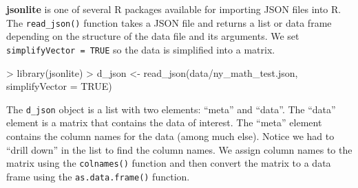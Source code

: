 \documentclass[
]{book}
\newenvironment{Shaded}{\begin{snugshade}}{\end{snugshade}}
\newcommand{\AttributeTok}[1]{\textcolor[rgb]{0.77,0.63,0.00}{#1}}
\newcommand{\ConstantTok}[1]{\textcolor[rgb]{0.00,0.00,0.00}{#1}}
\newcommand{\DecValTok}[1]{\textcolor[rgb]{0.00,0.00,0.81}{#1}}
\newcommand{\FunctionTok}[1]{\textcolor[rgb]{0.00,0.00,0.00}{#1}}
\newcommand{\NormalTok}[1]{#1}
\newcommand{\OtherTok}[1]{\textcolor[rgb]{0.56,0.35,0.01}{#1}}
\newcommand{\SpecialCharTok}[1]{\textcolor[rgb]{0.00,0.00,0.00}{#1}}
\newcommand{\StringTok}[1]{\textcolor[rgb]{0.31,0.60,0.02}{#1}}
\begin{document}
\textbf{jsonlite} is one of several R packages available for importing JSON files into R. The \texttt{read\_json()} function takes a JSON file and returns a list or data frame depending on the structure of the data file and its arguments. We set \texttt{simplifyVector\ =\ TRUE} so the data is simplified into a matrix.

\begin{Shaded}
\begin{Highlighting}[]
\SpecialCharTok{\textgreater{}} \FunctionTok{library}\NormalTok{(jsonlite)}
\SpecialCharTok{\textgreater{}}\NormalTok{ d\_json }\OtherTok{\textless{}{-}} \FunctionTok{read\_json}\NormalTok{(}\StringTok{\textquotesingle{}data/ny\_math\_test.json\textquotesingle{}}\NormalTok{, }\AttributeTok{simplifyVector =} \ConstantTok{TRUE}\NormalTok{)}
\end{Highlighting}
\end{Shaded}

The \texttt{d\_json} object is a list with two elements: ``meta'' and ``data''. The ``data'' element is a matrix that contains the data of interest. The ``meta'' element contains the column names for the data (among much else). Notice we had to ``drill down'' in the list to find the column names. We assign column names to the matrix using the \texttt{colnames()} function and then convert the matrix to a data frame using the \texttt{as.data.frame()} function.

\begin{Shaded}
\end{Shaded}
\end{document}
